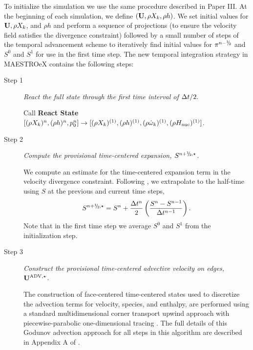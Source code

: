 To initialize the simulation we use the same procedure described in Paper III.
At the beginning of each simulation, we define $({\bf{U}},\rho X_k,\rho h)$.
We set initial values for ${\bf{U}}, \rho X_k$, and $\rho h$ and perform a sequence of projections 
(to ensure the velocity field satisfies the divergence constraint) 
followed by a small number of steps of the temporal advancement scheme to iteratively 
find initial values for $\pi^{n-\myhalf}$ and $S^0$ and $S^1$ for use in the first time step.
The new temporal integration strategy in MAESTROeX contains the following steps:
\begin{description}

\item[Step 1] {\em React the full state through the first time interval of $\Delta t / 2.$}

Call {\bf React State}$[(\rho X_k)^n, (\rho h)^n, p_0^n] \rightarrow [(\rho X_k)^{(1)}, (\rho h)^{(1)}, (\rho \dot\omega_k)^{(1)}, (\rho H_{\rm nuc})^{(1)}]$.


\item[Step 2] {\em Compute the provisional time-centered expansion,
    $S^{\nph,\star}$.}

We compute an estimate for the time-centered expansion term in the velocity
divergence constraint.  Following \citet{Bell:2004}, we extrapolate
to the half-time using $S$ at the previous and current
time steps,
\begin{equation}
S^{\nph,\star} = S^n + \frac{\dt^n}{2} \left(\frac{S^n - S^{n-1}}{\dt^{n-1}}\right).
\end{equation}
Note that in the first time step we average $S^0$ and $S^1$ from the
initialization step.

\item[Step 3] {\em Construct the provisional time-centered advective velocity on
edges, ${\bf{U}}^{\mathrm{ADV},\star}$.}

The construction of face-centered time-centered states used to discretize the
advection terms for velocity, species, and enthalpy, are performed using
a standard multidimensional corner transport upwind approach
\citep{colella1990multidimensional,saltzman1994unsplit} with piecewise-parabolic
one-dimensional tracing \citep{colella1984piecewise}.  The full details of this
Godunov advection approach for all steps in this algorithm are described 
in Appendix A of \cite{XRB_III}.


\end{description}
